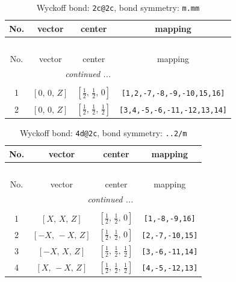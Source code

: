 \documentclass[fleqn,8pt]{jsarticle}
\begin{document}
\renewcommand{\arraystretch}{1.2}
\begin{longtable}{cccc}
\caption{Wyckoff bond: {\tt 2c@2c}, bond symmetry: {\tt m.mm}}
 \\
 \hline \hline
No. & vector & center & mapping \\ \hline \endfirsthead

\multicolumn{3}{l}{\tablename\ \thetable{}} \\
 \hline \hline
No. & vector & center & mapping \\ \hline \endhead

 \hline \hline
\multicolumn{3}{r}{\footnotesize\it continued ...} \\ \endfoot

 \hline \hline
\multicolumn{3}{r}{} \\ \endlastfoot

1 & $\left[ 0,\, 0,\, Z \right]$ & $\left[ \frac{1}{2},\, \frac{1}{2},\, 0 \right]$ & {\tt [1,2,-7,-8,-9,-10,15,16]} \\ \hline
2 & $\left[ 0,\, 0,\, Z \right]$ & $\left[ \frac{1}{2},\, \frac{1}{2},\, \frac{1}{2} \right]$ & {\tt [3,4,-5,-6,-11,-12,13,14]} \\
\end{longtable}
\renewcommand{\arraystretch}{1.2}
\begin{longtable}{cccc}
\caption{Wyckoff bond: {\tt 4d@2c}, bond symmetry: {\tt ..2/m}}
 \\
 \hline \hline
No. & vector & center & mapping \\ \hline \endfirsthead

\multicolumn{3}{l}{\tablename\ \thetable{}} \\
 \hline \hline
No. & vector & center & mapping \\ \hline \endhead

 \hline \hline
\multicolumn{3}{r}{\footnotesize\it continued ...} \\ \endfoot

 \hline \hline
\multicolumn{3}{r}{} \\ \endlastfoot

1 & $\left[ X,\, X,\, Z \right]$ & $\left[ \frac{1}{2},\, \frac{1}{2},\, 0 \right]$ & {\tt [1,-8,-9,16]} \\ \hline
2 & $\left[ - X,\, - X,\, Z \right]$ & $\left[ \frac{1}{2},\, \frac{1}{2},\, 0 \right]$ & {\tt [2,-7,-10,15]} \\ \hline
3 & $\left[ - X,\, X,\, Z \right]$ & $\left[ \frac{1}{2},\, \frac{1}{2},\, \frac{1}{2} \right]$ & {\tt [3,-6,-11,14]} \\ \hline
4 & $\left[ X,\, - X,\, Z \right]$ & $\left[ \frac{1}{2},\, \frac{1}{2},\, \frac{1}{2} \right]$ & {\tt [4,-5,-12,13]} \\
\end{longtable}
\end{document}
